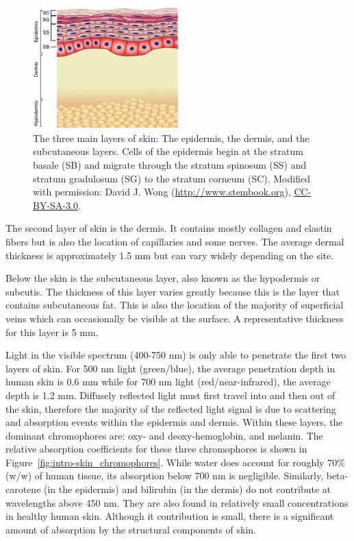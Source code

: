 \begin{figure}
	\centering \includegraphics[width=0.5\textwidth]{figures/intro-skin_layers.jpg}
	\caption[Cross-section of layers of human skin]{\label{fig:intro-skin_layers}The three main layers of skin: The epidermis, the dermis, and the subcutaneous layers. Cells of the epidermis begin at the stratum basale (SB) and migrate through the stratum spinosum (SS) and stratum gradulosum (SG) to the stratum corneum (SC). Modified with permission: \textcopyright David J. Wong (\url{http://www.stembook.org}), \href{http://creativecommons.org/licenses/by-sa/3.0/}{CC-BY-SA-3.0}.\cite{Wong2009}}
\end{figure}

The second layer of skin is the dermis. It contains mostly collagen and elastin fibers but is also the location of capillaries and some nerves. The average dermal thickness is approximately 1.5 mm but can vary widely depending on the site.

Below the skin is the subcutaneous layer, also known as the hypodermis or subcutis. The thickness of this layer varies greatly because this is the layer that contains subcutaneous fat. This is also the location of the majority of superficial veins which can occasionally be visible at the surface. A representative thickness for this layer is 5 mm.

Light in the visible spectrum (400-750 nm) is only able to penetrate the first two layers of skin.\cite{Kochevar2012a} For 500 nm light (green/blue), the average penetration depth in human skin is 0.6 mm while for 700 nm light (red/near-infrared), the average depth is 1.2 mm. Diffusely reflected light must first travel into and then out of the skin, therefore the majority of the reflected light signal is due to scattering and absorption events within the epidermis and dermis. Within these layers, the dominant chromophores are: oxy- and deoxy-hemoglobin, and melanin. The relative absorption coefficients for these three chromophores is shown in Figure~\ref{fig:intro-skin_chromophores}. While water does account for roughly 70\% (w/w) of human tissue,\cite{Nakagawa2010} its absorption below 700 nm is negligible. Similarly, beta-carotene (in the epidermis) and bilirubin (in the dermis) do not contribute at wavelengths above 450 nm. They are also found in relatively small concentrations in healthy human skin. Although it contribution is small, there is a significant amount of absorption by the structural components of skin.\cite{Bargo2005}

